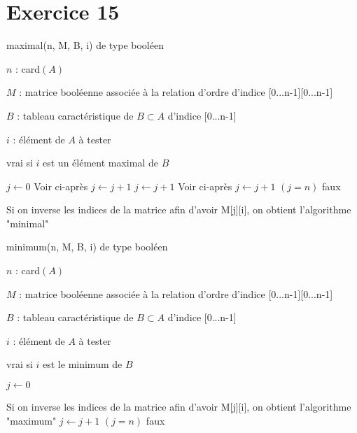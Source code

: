 \documentclass[a4paper,12pt]{article}
\begin{document}
\section*{Exercice 15}

\begin{algorithm}
	\caption{maximal(n, M, B, i) de type booléen}
	\begin{algorithmic}[1]
\Require 

	$n$ : card$(A)$

	$M$ : matrice booléenne associée à  la relation d'ordre d'indice [0...n-1][0...n-1]

	$B$ : tableau caractéristique de $B\subset A$ d'indice [0...n-1]

	$i$ : élément de $A$ à  tester
\Ensure 

	vrai si $i$ est un élément maximal de $B$

\Begin
		\State $j \leftarrow 0$
		 \Comment Voir ci-après
			\State $j \leftarrow j + 1$
		\EndWhile
			\State $j \leftarrow j + 1$
			 \Comment Voir ci-après
				\State $j \leftarrow j + 1$
			\EndWhile
			\State \Return $(j=n)$
		\EndIf
	\EndIf
	\State \Return faux

	\Comment Si on inverse les indices de la matrice afin d'avoir M[j][i], on obtient l'algorithme "minimal"
\EndBegin
	\end{algorithmic}
\end{algorithm}

\begin{algorithm}
	\caption{minimum(n, M, B, i) de type booléen}
	\begin{algorithmic}[1]

	\Require 

	$n$ : card$(A)$

	$M$ : matrice booléenne associée à  la relation d'ordre d'indice [0...n-1][0...n-1]

	$B$ : tableau caractéristique de $B\subset A$ d'indice [0...n-1]

	$i$ : élément de $A$ à  tester
\Ensure 

	vrai si $i$ est le minimum de $B$

\Begin
		\State $j \leftarrow 0$
		
		\Comment Si on inverse les indices de la matrice afin d'avoir M[j][i], on obtient l'algorithme "maximum"
			\State $j \leftarrow j + 1$
		\EndWhile
		\State \Return $(j=n)$
	\EndIf
	\State \Return faux
\EndBegin
	\end{algorithmic}
\end{algorithm}
\end{document}
